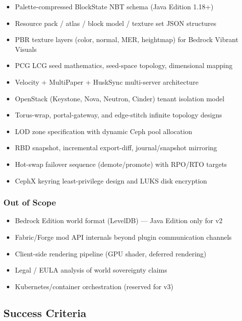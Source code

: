 \documentclass[11pt,letterpaper]{article}
\begin{document}
\begin{itemize}[leftmargin=2em]
  \item Palette-compressed BlockState NBT schema (Java Edition 1.18+)
  \item Resource pack / atlas / block model / texture set JSON structures
  \item PBR texture layers (color, normal, MER, heightmap) for Bedrock Vibrant Visuals
  \item PCG LCG seed mathematics, seed-space topology, dimensional mapping
  \item Velocity + MultiPaper + HuskSync multi-server architecture
  \item OpenStack (Keystone, Nova, Neutron, Cinder) tenant isolation model
  \item Torus-wrap, portal-gateway, and edge-stitch infinite topology designs
  \item LOD zone specification with dynamic Ceph pool allocation
  \item RBD snapshot, incremental export-diff, journal/snapshot mirroring
  \item Hot-swap failover sequence (demote/promote) with RPO/RTO targets
  \item CephX keyring least-privilege design and LUKS disk encryption
\end{itemize}

\subsubsection{Out of Scope}

\begin{itemize}[leftmargin=2em]
  \item Bedrock Edition world format (LevelDB) --- Java Edition only for v2
  \item Fabric/Forge mod API internals beyond plugin communication channels
  \item Client-side rendering pipeline (GPU shader, deferred rendering)
  \item Legal / EULA analysis of world sovereignty claims
  \item Kubernetes/container orchestration (reserved for v3)
\end{itemize}

\subsection{Success Criteria}
\end{document}

